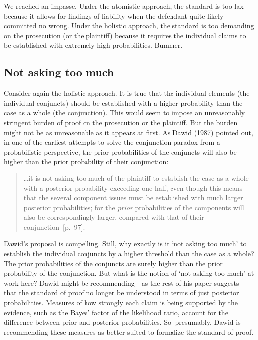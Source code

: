 \documentclass[
  10pt,
  dvipsnames,enabledeprecatedfontcommands]{scrartcl}
\begin{document}
We reached an impasse. Under the atomistic approach, the standard is too
lax because it allows for findings of liability when the defendant quite
likely committed no wrong. Under the holistic approach, the standard is
too demanding on the prosecution (or the plaintiff) because it requires
the individual claims to be established with extremely high
probabilities. Bummer.

\hypertarget{not-asking-too-much}{%
\subsection{Not asking too much}\label{not-asking-too-much}}

Consider again the holistic approach. It is true that the individual
elements (the individual conjuncts) should be established with a higher
probability than the case as a whole (the conjunction). This would seem
to impose an unreasonably stringent burden of proof on the prosecution
or the plaintiff. But the burden might not be as unreasonable as it
appears at first. As Dawid (1987) pointed out, in one of the earliest
attempts to solve the conjunction paradox from a probabilistic
perspective, the prior probabilities of the conjuncts will also be
higher than the prior probability of their conjunction:

\begin{quote}
\dots it is not asking too much of the plaintiff to establish the case as a whole with a posterior probability exceeding one half, even though this means  that the several component issues must be established with much larger posterior probabilities; for the \textit{prior}  probabilities of the components will also be correspondingly larger, compared with that of their conjunction~[p.~97].
 \end{quote}

Dawid's proposal is compelling. Still, why exactly is it `not asking too
much' to establish the individual conjuncts by a higher threshold than
the case as a whole? The prior probabilities of the conjuncts are surely
higher than the prior probability of the conjunction. But what is the
notion of `not asking too much' at work here? Dawid might be
recommending---as the rest of his paper suggests---that the standard of
proof no longer be understood in terms of just posterior probabilities.
Measures of how strongly each claim is being supported by the evidence,
such as the Bayes' factor of the likelihood ratio, account for the
difference between prior and posterior probabilities. So, presumably,
Dawid is recommending these measures as better suited to formalize the
standard of proof.
\end{document}

